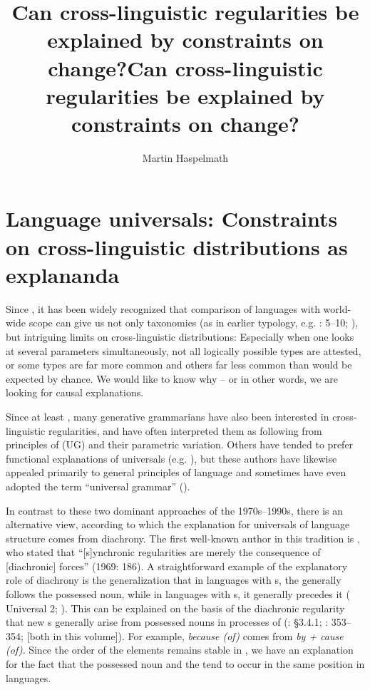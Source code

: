 \documentclass[output=paper]{langsci/langscibook}
\author{Martin Haspelmath\affiliation{MPI-SHH Jena \& Leipzig University}}
\title{Can cross-linguistic regularities be explained by constraints on change?}
\begin{document}
\maketitle 

\title{{Can cross-linguistic} regularities be explained by constraints on change?}

 
 

\section{Language universals: Constraints on cross-linguistic distributions as explananda}\label{sec:haspelmath:1}

Since \citet{Greenberg1963}, it has been widely recognized that comparison of languages with world-wide scope can give us not only taxonomies (as in earlier typology, e.g. \citealt{Schlegel1808,Schleicher1850}: 5–10; \citealt{Sapir1921}), but intriguing limits on cross-linguistic distributions: Especially when one looks at several parameters simultaneously, not all logically possible types are attested, or some types are far more common and others far less common than would be expected by chance. We would like to know why – or in other words, we are looking for causal explanations.

Since at least \citet{Chomsky1981}, many generative grammarians have also been interested in cross-linguistic regularities, and have often interpreted them as following from  principles of  (UG) and their parametric variation. Others have tended to prefer functional explanations of universals (e.g. \citealt{Comrie1989,Stassen1985,Dixon1994,Dik1997,Hawkins2014_VarEff}), but these authors have likewise appealed primarily to general principles of language and sometimes have even adopted the term “universal grammar” (\citealt{KeenanComrie1977,FoleyVanValin1984,Stassen1985}).

In contrast to these two dominant approaches of the 1970s–1990s, there is an alternative view, according to which the explanation for universals of language structure comes from diachrony. The first well-known author in this tradition is \citet{Greenberg1969}, who stated that “[s]ynchronic regularities are merely the consequence of [diachronic] forces” (1969: 186). A straightforward example of the explanatory role of diachrony is the generalization that in languages with s, the  generally follows the possessed noun, while in languages with s, it generally precedes it ( Universal 2; \citealt{Dryer1992}). This can be explained on the basis of the diachronic regularity that new s generally arise from possessed nouns in processes of  (\citealt{Lehmann1982_Thoughts}: §3.4.1; \citealt{Bybee1988}: 353–354; \citealt{Collins2019tv,Dryer2019tv} [both in  this volume]). For example,  \textit{because (of)} comes from \textit{by + cause (of)}. Since the order of the elements remains stable in , we have an explanation for the fact that the possessed noun and the  tend to occur in the same position in languages.
\end{document}
